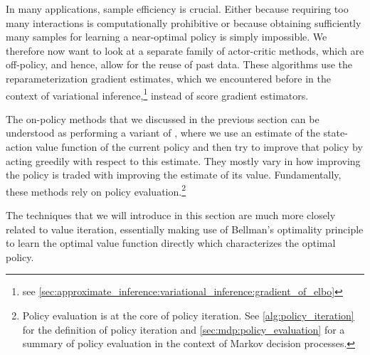 In many applications, sample efficiency is crucial.
Either because requiring too many interactions is computationally prohibitive or because obtaining sufficiently many samples for learning a near-optimal policy is simply impossible.
We therefore now want to look at a separate family of actor-critic methods, which are off-policy, and hence, allow for the reuse of past data. These algorithms use the reparameterization gradient estimates, which we encountered before in the context of variational inference,\footnote{see \cref{sec:approximate_inference:variational_inference:gradient_of_elbo}} instead of score gradient estimators.

The on-policy methods that we discussed in the previous section can be understood as performing a variant of , where we use an estimate of the state-action value function of the current policy and then try to improve that policy by acting greedily with respect to this estimate.
They mostly vary in how improving the policy is traded with improving the estimate of its value.
Fundamentally, these methods rely on policy evaluation.\footnote{Policy evaluation is at the core of policy iteration. See \cref{alg:policy_iteration} for the definition of policy iteration and \cref{sec:mdp:policy_evaluation} for a summary of policy evaluation in the context of Markov decision processes.}

The techniques that we will introduce in this section are much more closely related to value iteration, essentially making use of Bellman's optimality principle to learn the optimal value function directly which characterizes the optimal policy.

